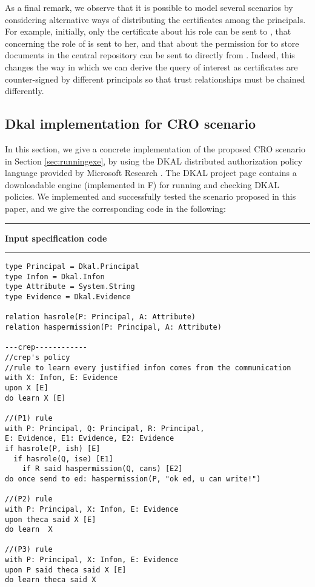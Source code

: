 \documentclass[conference]{llncs}
\newcommand{\CRO}{CRO}
\begin{document}
{As a final remark, we observe that it is possible to model several
scenarios by considering alternative ways of distributing the
certificates among the principals.  For example, initially, only the
certificate about his role can be sent to , that concerning the
role of  is sent to her, and that about the permission for
 to store documents in the central repository can be sent to
 directly from .  Indeed, this changes the way in which
we can derive the query of interest as certificates are counter-signed
by different principals so that trust relationships must be chained
differently. 



\subsection{Dkal implementation for \CRO{} scenario}
In this section, we give a concrete implementation of the proposed CRO scenario in Section \ref{sec:runningexe},
by using the DKAL distributed authorization policy language provided by Microsoft Research \cite{msr}. 
The DKAL project page \cite{dkalimpl} contains a downloadable engine (implemented in F) for running and checking DKAL policies. 
We implemented and successfully tested the scenario proposed in this paper, and we give the corresponding code in the following:\\

\hrule
\vspace*{.2cm}
\textbf{Input specification code}
\vspace*{.2cm}
\hrule
\small
\begin{verbatim}
type Principal = Dkal.Principal
type Infon = Dkal.Infon
type Attribute = System.String
type Evidence = Dkal.Evidence

relation hasrole(P: Principal, A: Attribute)
relation haspermission(P: Principal, A: Attribute)

---crep------------
//crep's policy
//rule to learn every justified infon comes from the communication
with X: Infon, E: Evidence
upon X [E]
do learn X [E]

//(P1) rule
with P: Principal, Q: Principal, R: Principal, 
E: Evidence, E1: Evidence, E2: Evidence
if hasrole(P, ish) [E]
  if hasrole(Q, ise) [E1]
    if R said haspermission(Q, cans) [E2]
do once send to ed: haspermission(P, "ok ed, u can write!")

//(P2) rule	
with P: Principal, X: Infon, E: Evidence
upon theca said X [E]
do learn  X

//(P3) rule
with P: Principal, X: Infon, E: Evidence
upon P said theca said X [E]
do learn theca said X


\end{verbatim}}
\end{document}
